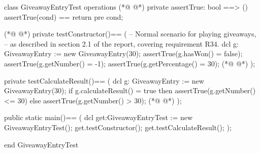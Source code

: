 \begin{vdmpp}[breaklines=true]
class GiveawayEntryTest
 operations
(*@
\label{assertTrue:3}
@*)
  private assertTrue: bool ==> ()
    assertTrue(cond) == return
    pre cond;
    
(*@
\label{testConstructor:7}
@*)
  private testConstructor()==
  (
    -- Normal scenario for playing giveaways,
     -- as described in section 2.1 of the report, covering requirement R34.
   dcl g: GiveawayEntry := new GiveawayEntry(30);
   assertTrue(g.hasWon() = false);
   assertTrue(g.getNumber() = -1);
   assertTrue(g.getPercentage() = 30);
(*@
\label{testCalculateResult:15}
@*)
  );

  private testCalculateResult()==
  (
   dcl g: GiveawayEntry := new GiveawayEntry(30);
   if g.calculateResult() = true
    then assertTrue(g.getNumber() <= 30)
    else assertTrue(g.getNumber() > 30);
(*@
\label{main:23}
@*)
  );
  
  public static main()==
    (
   dcl get:GiveawayEntryTest := new GiveawayEntryTest();
   get.testConstructor();
   get.testCalculateResult();
    );
     
end GiveawayEntryTest
\end{vdmpp}
